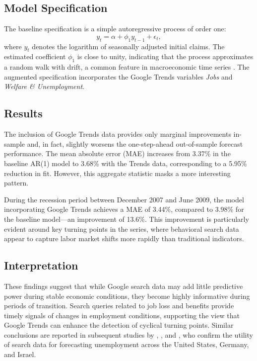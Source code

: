 \documentclass{article}
\begin{document}
\subsection{Model Specification}
The baseline specification is a simple autoregressive process of order one:
\[
y_t = \alpha + \phi_1 y_{t-1} + \epsilon_t,
\]
where $y_t$ denotes the logarithm of seasonally adjusted initial claims. 
The estimated coefficient $\phi_1$ is close to unity, indicating that the process approximates a random walk with drift, a common feature in macroeconomic time series \parencite{NelsonPlosser1982}. 
The augmented specification incorporates the Google Trends variables \textit{Jobs} and \textit{Welfare \& Unemployment}.

\subsection{Results}
The inclusion of Google Trends data provides only marginal improvements in-sample and, in fact, slightly worsens the one-step-ahead out-of-sample forecast performance. 
The mean absolute error (MAE) increases from 3.37\% in the baseline AR(1) model to 3.68\% with the Trends data, corresponding to a 5.95\% reduction in fit. 
However, this aggregate statistic masks a more interesting pattern.

During the recession period between December 2007 and June 2009, the model incorporating Google Trends achieves a MAE of 3.44\%, compared to 3.98\% for the baseline model—an improvement of 13.6\%. 
This improvement is particularly evident around key turning points in the series, where behavioral search data appear to capture labor market shifts more rapidly than traditional indicators.

\subsection{Interpretation}
These findings suggest that while Google search data may add little predictive power during stable economic conditions, they become highly informative during periods of transition. 
Search queries related to job loss and benefits provide timely signals of changes in employment conditions, supporting the view that Google Trends can enhance the detection of cyclical turning points. 
Similar conclusions are reported in subsequent studies by \textcite{Askitas2010}, \textcite{Suhoy2009}, and \textcite{DAmuri2010}, who confirm the utility of search data for forecasting unemployment across the United States, Germany, and Israel.
\end{document}
